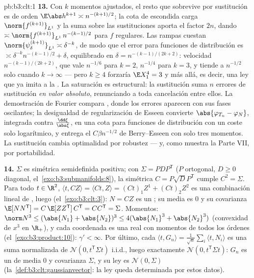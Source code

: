 \begin{solution}{pb:b3:clt:1}
\textbf{13.} Con $k$ momentos ajustados, el resto que sobrevive por
sustitución es de orden $\E\abs h^{k+1} \asymp
n^{-(k+1)/2}$; la cota de 
escondida carga $\norm{f^{(k+1)}}_{L^1}$ y la suma sobre las
sustituciones aporta el factor $2n$, dando
$\asymp\norm{f^{(k+1)}}_{L^1}\,
n^{-(k-1)/2}$ para $f$ regulares. Las rampas cuestan
$\norm{\psi_\delta^{(k+1)}}_{L^1} \asymp \delta^{-k}$, de modo que el
error para funciones de distribución es $\asymp
\delta^{-k}n^{-(k-1)/2} + \delta$, equilibrado en $\delta =
n^{-(k-1)/(2k+2)}$: velocidad $n^{-(k-1)/(2k+2)}$, que vale $n^{-1/6}$
para $k = 2$, $n^{-1/4}$ para $k = 3$, y tiende a $n^{-1/2}$ solo cuando
$k \to \infty$ --- pero $k \geq 4$ forzaría $\E X_1^4 = 3$ y más allá,
es decir, una ley que ya imita a la
. La saturación es
estructural: la sustitución suma $n$ errores de sustitución \emph{en
valor absoluto}, renunciando a toda cancelación entre ellos. La
demostración de Fourier compara , donde los errores aparecen con sus fases oscilantes;
la desigualdad de regularización de Esseen convierte $\abs{\varphi_{T_n}
- \varphi_N}$, integrada contra $\frac{\dd\xi}{\abs\xi}$, en una cota
para funciones de distribución con un coste solo logarítmico, y entrega
el $C\beta n^{-1/2}$ de Berry--Esseen con solo tres momentos. La
sustitución cambia optimalidad por robustez --- y, como muestra la Parte
VII, por portabilidad.

\textbf{14.} $\Sigma$ es simétrica semidefinida positiva; con
$\Sigma = PDP^{\mathsf T}$ ($P$ ortogonal, $D \geq 0$ diagonal,
el~\cref{exo:b3:submanifolds:8}), la simétrica $C =
P\sqrt DP^{\mathsf T}$ cumple $C^2 = \Sigma$. Para todo $t
\in \R^2$, $\langle t, CZ\rangle = \langle Ct, Z\rangle =
(Ct)_1Z^1 + (Ct)_2Z^2$ es una combinación lineal de
, luego
 (el~\cref{exo:b3:clt:3}):
$N = CZ$ es un ; su
media es $0$ y su covarianza $\E[NN^{\mathsf T}] =
C\,\E[ZZ^{\mathsf T}]\,C^{\mathsf T} = CC^{\mathsf T} =
\Sigma$. Momentos: $\norm N^3 \leq (\abs{N_1} +
\abs{N_2})^3 \leq 4(\abs{N_1}^3 + \abs{N_2}^3)$ (convexidad de $x^3$ en
$\R_+$), y cada coordenada es una
 real con momentos de todos
los órdenes (el~\cref{exo:b3:product:10}): $\gamma' < \infty$. Por
último, cada $\langle t, G_n\rangle = \frac1{\sqrt
n}\sum_i\langle t, N_i\rangle$ es una suma normalizada de
$\mathcal N(0, t^{\mathsf T}\Sigma t)$ i.i.d., luego exactamente
$\mathcal N(0, t^{\mathsf T}\Sigma t)$: $G_n$ es un
 de media $0$ y
covarianza $\Sigma$, y su ley es $\mathcal N(0, \Sigma)$
(la~\cref{def:b3:clt:gaussianvector}: la ley queda determinada por estos
datos).


\end{solution}
